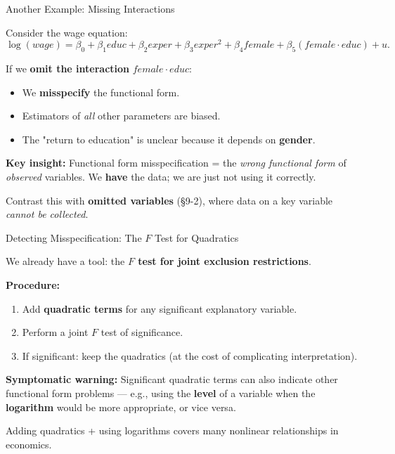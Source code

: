 \documentclass[aspectratio=169, 12pt]{beamer}
\begin{document}
\begin{frame}{Another Example: Missing Interactions}

  Consider the wage equation:
  \[
    \log(\mathit{wage}) = \beta_0 + \beta_1 \mathit{educ} + \beta_2 \mathit{exper} + \beta_3 \mathit{exper}^2
    + \beta_4 \mathit{female} + \beta_5 (female \cdot educ) + u.
  \]

  \smallskip
  If we \textbf{omit the interaction} $female \cdot educ$:
  \begin{itemize}\setlength{\itemsep}{2pt}
    \item We \textbf{misspecify} the functional form.
    \item Estimators of \emph{all} other parameters are biased.
    \item The "return to education" is unclear because it depends on \textbf{gender}.
  \end{itemize}

  \begin{keybox}
    \textbf{Key insight:} Functional form misspecification = the
    \emph{wrong functional form} of \emph{observed} variables. We \textbf{have} the data;
    we are just not using it correctly.

    \medskip
    Contrast this with \textbf{omitted variables} (§9-2), where data on a key variable
    \emph{cannot be collected}.
  \end{keybox}

\end{frame}

\begin{frame}{Detecting Misspecification: The $F$ Test for Quadratics}

  We already have a tool: the \textbf{$F$ test for joint exclusion restrictions}.

  \medskip
  \textbf{Procedure:}
  \begin{enumerate}\setlength{\itemsep}{2pt}
    \item Add \textbf{quadratic terms} for any significant explanatory variable.
    \item Perform a joint $F$ test of significance.
    \item If significant: keep the quadratics (at the cost of complicating interpretation).
  \end{enumerate}

  \begin{keybox}
    \textbf{Symptomatic warning:} Significant quadratic terms can also indicate
    other functional form problems — e.g., using the \textbf{level} of a variable
    when the \textbf{logarithm} would be more appropriate, or vice versa.

    \medskip
    Adding quadratics + using logarithms covers many nonlinear relationships in economics.
  \end{keybox}

\end{frame}
\end{document}
